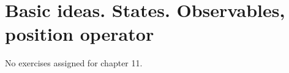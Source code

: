 \section{Basic ideas. States. Observables, position operator}

No exercises assigned for chapter 11.